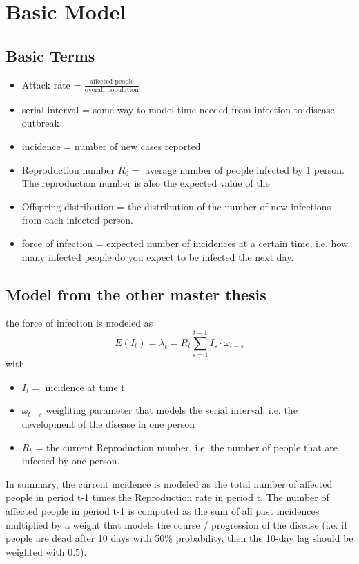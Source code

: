 
\chapter{Basic Model}

\section{Basic Terms}

\begin{itemize}
\item Attack rate = $\frac{\text{affected people}}{\text{overall population}}$
\item serial interval = some way to model time needed from infection to disease outbreak
\item incidence = number of new cases reported
\item Reproduction number $R_0 = $ average number of people infected by 1 person. The reproduction number is also the expected value of the 
\item Offspring distribution = the distribution of the number of new infections from each infected person.
\item force of infection = expected number of incidences at a certain time, i.e. how many infected people do you expect to be infected the next day. 
\end{itemize}



\section{Model from the other master thesis}
the force of infection is modeled as
\begin{equation}
E(I_t) = \lambda_t =  R_t \sum_{s=1}^{t-1} I_s \cdot \omega_{t-s} 
\end{equation}
with 
\begin{itemize}
\item $I_t = $ incidence at time t
\item $\omega_{t-s}$ weighting parameter that models the serial interval, i.e. the development of the disease in one person
\item $R_t$ = the current Reproduction number, i.e. the number of people that are infected by one person. 
\end{itemize}
In summary, the current incidence is modeled as the total number of affected people in period t-1 times the Reproduction rate in period t. The number of affected people in period t-1 is computed as the sum of all past incidences multiplied by a weight that models the course / progression of the disease (i.e. if people are dead after 10 days with 50\% probability, then the 10-day lag should be weighted with 0.5). 

